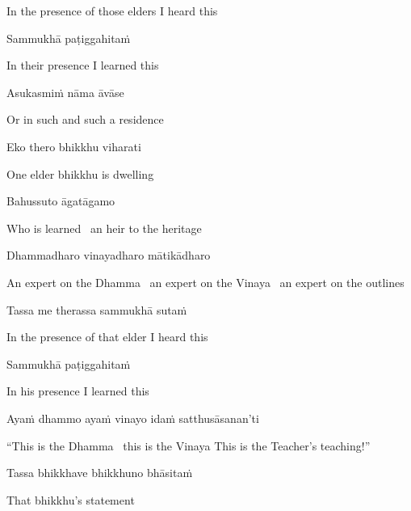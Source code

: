 \begin{english}
  In the presence of those elders I heard this
\end{english}

Sammukhā paṭiggahitaṁ

\begin{english}
  In their presence I learned this
\end{english}

Asukasmiṁ nāma āvāse

\begin{english}
  Or in such and such a residence
\end{english}

Eko thero bhikkhu viharati

\begin{english}
  One elder bhikkhu is dwelling
\end{english}

Bahussuto āgatāgamo

\begin{english}
  Who is learned \breathmark\ an heir to the heritage
\end{english}

Dhammadharo vinayadharo mātikādharo

\begin{english}
  An expert on the Dhamma \breathmark\ an expert on the Vinaya \breathmark\ an expert on the outlines
\end{english}

Tassa me therassa sammukhā sutaṁ

\begin{english}
  In the presence of that elder I heard this
\end{english}

Sammukhā paṭiggahitaṁ

\begin{english}
  In his presence I learned this
\end{english}

Ayaṁ dhammo ayaṁ vinayo idaṁ satthusāsanan’ti

\begin{english}
  “This is the Dhamma \breathmark\ this is the Vinaya
  This is the Teacher’s teaching!”
\end{english}

Tassa bhikkhave bhikkhuno bhāsitaṁ

\begin{english}
  That bhikkhu’s statement
\end{english}


